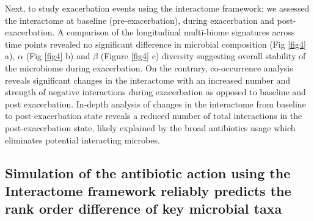 Next, to study exacerbation events using the interactome framework; we assessed the interactome at baseline (pre-exacerbation), during exacerbation and post-exacerbation. A comparison of the longitudinal multi-biome signatures across time points revealed no significant difference in microbial composition (Fig \ref{fig4} a), $\alpha$ (Fig \ref{fig4} b) and $\beta$ (Figure \ref{fig4} c) diversity suggesting overall stability of the microbiome during exacerbation. On the contrary, co-occurrence analysis reveals significant changes in the interactome with an increased number and strength of negative interactions during exacerbation as opposed to baseline and post exacerbation. In-depth analysis of changes in the interactome from baseline to post-exacerbation state reveals a reduced number of total interactions in the post-exacerbation state, likely explained by the broad antibiotics usage which eliminates potential interacting microbes.\\

\subsection{Simulation of the antibiotic action using the Interactome framework reliably predicts the rank order difference of key microbial taxa}

